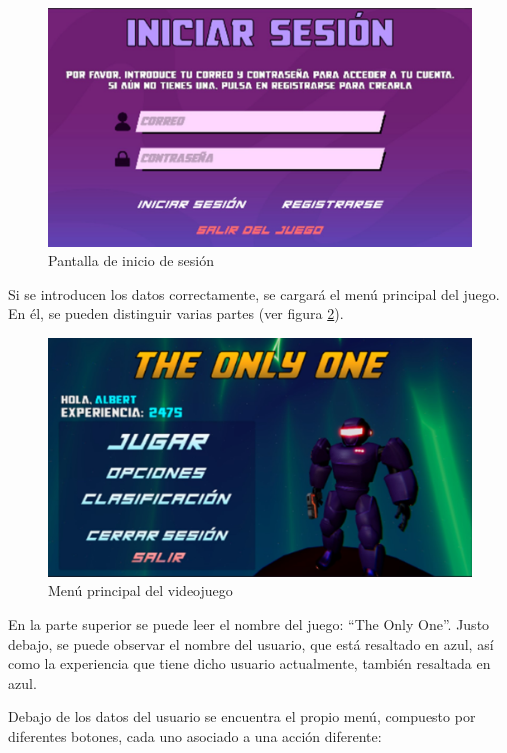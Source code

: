 \begin{figure}[h]
    \centering
    \includegraphics[scale=0.45]{img/LoginScreen.jpg}
    \caption{Pantalla de inicio de sesión}
    \label{fig:PantallaInicioSesión}
    \end{figure}
    
Si se introducen los datos correctamente, se cargará el menú principal del juego. En él, se pueden distinguir varias partes (ver figura \ref{fig:MenuPincipal}).

\begin{figure}[h]
    \centering
    \includegraphics[scale=0.45]{img/MainMenu.jpg}
    \caption{Menú principal del videojuego}
    \label{fig:MenuPincipal}
    \end{figure}
    
En la parte superior se puede leer el nombre del juego: ``The Only One''. Justo debajo, se puede observar el nombre del usuario, que está resaltado en azul, así como la experiencia que tiene dicho usuario actualmente, también resaltada en azul.

Debajo de los datos del usuario se encuentra el propio menú, compuesto por diferentes botones, cada uno asociado a una acción diferente:


